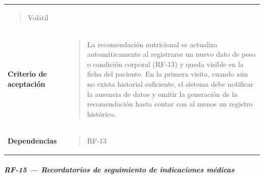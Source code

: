 \documentclass[
]{article}
\begin{document}
{\begin{longtable}[]{@{}
  >{\raggedright\arraybackslash}p{}
  >{\raggedright\arraybackslash}p{}@{}}
\begin{minipage}[t]{\linewidth}
\begin{quote}
Volátil
\end{quote}
\end{minipage} \\
\textbf{Criterio de aceptación} &
\begin{minipage}[t]{\linewidth}\raggedright
\begin{quote}
La recomendación nutricional se actualiza automáticamente al registrarse
un nuevo dato de peso o condición corporal (RF-13) y queda visible en la
ficha del paciente. En la primera visita, cuando aún no exista historial
suficiente, el sistema debe notificar la ausencia de datos y omitir la
generación de la recomendación hasta contar con al menos un registro
histórico.
\end{quote}
\end{minipage} \\
\textbf{Dependencias} & \begin{minipage}[t]{\linewidth}\raggedright
\begin{quote}
RF-13
\end{quote}
\end{minipage} \\
\end{longtable}
}

\subparagraph{RF-15 --- Recordatorios de seguimiento de indicaciones
médicas}\label{rf-15-recordatorios-de-seguimiento-de-indicaciones-muxe9dicas}
\end{document}
